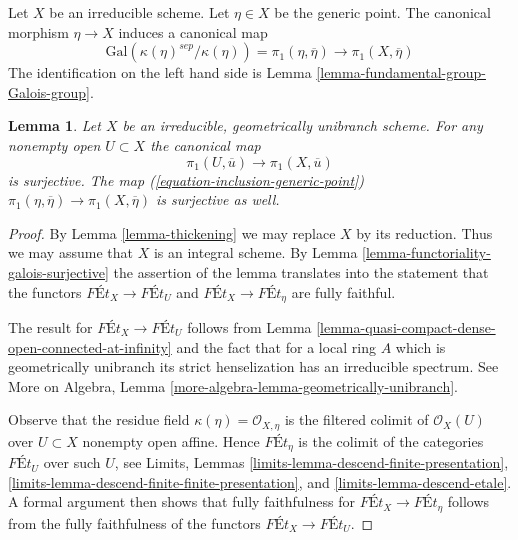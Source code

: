 \documentclass{stacks-project}
\theoremstyle{plain}
\newtheorem{lemma}[subsection]{Lemma}
\theoremstyle{definition}
\theoremstyle{remark}
\numberwithin{equation}{subsection}
\begin{document}
\noindent
Let $X$ be an irreducible scheme. Let $\eta \in X$ be the generic
point. The canonical morphism $\eta \to X$ induces a canonical map
\begin{equation}
\label{equation-inclusion-generic-point}
\text{Gal}(\kappa(\eta)^{sep}/\kappa(\eta)) = \pi_1(\eta, \overline{\eta})
\longrightarrow \pi_1(X, \overline{\eta})
\end{equation}
The identification on the left hand side is
Lemma \ref{lemma-fundamental-group-Galois-group}.

\begin{lemma}
\label{lemma-irreducible-geometrically-unibranch}
Let $X$ be an irreducible, geometrically unibranch scheme.
For any nonempty open $U \subset X$ the canonical map
$$
\pi_1(U, \overline{u}) \longrightarrow \pi_1(X, \overline{u})
$$
is surjective. The map (\ref{equation-inclusion-generic-point})
$\pi_1(\eta, \overline{\eta}) \to \pi_1(X, \overline{\eta})$
is surjective as well.
\end{lemma}

\begin{proof}
By Lemma \ref{lemma-thickening} we may replace $X$ by its reduction.
Thus we may assume that $X$ is an integral scheme. By
Lemma \ref{lemma-functoriality-galois-surjective}
the assertion of the lemma translates into the statement that
the functors $\textit{F\'Et}_X \to \textit{F\'Et}_U$ and
$\textit{F\'Et}_X \to \textit{F\'Et}_\eta$ are fully faithful.

\medskip\noindent
The result for $\textit{F\'Et}_X \to \textit{F\'Et}_U$ follows
from Lemma \ref{lemma-quasi-compact-dense-open-connected-at-infinity}
and the fact that for a local ring $A$ which is
geometrically unibranch its strict henselization has an
irreducible spectrum. See
More on Algebra, Lemma \ref{more-algebra-lemma-geometrically-unibranch}.

\medskip\noindent
Observe that the residue field $\kappa(\eta) = \mathcal{O}_{X, \eta}$
is the filtered colimit of $\mathcal{O}_X(U)$ over $U \subset X$
nonempty open affine. Hence $\textit{F\'Et}_\eta$ is the colimit of the
categories $\textit{F\'Et}_U$ over such $U$, see
Limits, Lemmas \ref{limits-lemma-descend-finite-presentation},
\ref{limits-lemma-descend-finite-finite-presentation}, and
\ref{limits-lemma-descend-etale}.
A formal argument then shows that fully faithfulness for
$\textit{F\'Et}_X \to \textit{F\'Et}_\eta$ follows from the
fully faithfulness of the functors $\textit{F\'Et}_X \to \textit{F\'Et}_U$.
\end{proof}
\end{document}
